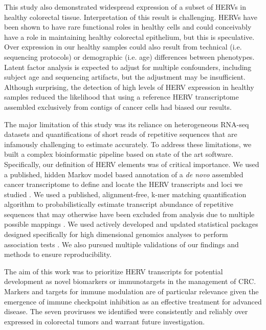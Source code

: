 This study also demonstrated widespread expression of a subset of HERVs in healthy colorectal tissue.
Interpretation of this result is challenging.
HERVs have been shown to have rare functional roles in healthy cells \citep{Rote2004} and could conceivably have a role in maintaining healthy colorectal epithelium, but this is speculative.
Over expression in our healthy samples could also result from technical (i.e. sequencing protocols) or demographic (i.e. age) differences between phenotypes.
Latent factor analysis is expected to adjust for multiple confounders, including subject age and sequencing artifacts, but the adjustment may be insufficient.
Although surprising, the detection of high levels of HERV expression in healthy samples reduced the likelihood that using a reference HERV transcriptome assembled exclusively from contigs of cancer cells had biased our results.

The major limitation of this study was its reliance on heterogeneous RNA-seq datasets and quantifications of short reads of repetitive sequences that are infamously challenging to estimate accurately.
To address these limitations, we built a complex bioinformatic pipeline based on state of the art software.
Specifically, our definition of HERV elements was of critical importance.
We used a published, hidden Markov model based annotation of a \emph{de novo} assembled cancer transcriptome to define and locate the HERV transcripts and loci we studied \citep{Attig2019}.
We used a published, alignment-free, k-mer matching quantification algorithm to probabilistically estimate transcript abundance of repetitive sequences that may otherwise have been excluded from analysis due to multiple possible mappings \citep{Patro2017}.
We used actively developed and updated statistical packages designed specifically for high dimensional genomics analyses to perform association tests \citep{Love2014, sva}.
We also pursued multiple validations of our findings and methods to ensure reproducibility.

The aim of this work was to prioritize HERV transcripts for potential development as novel biomarkers or immunotargets in the management of CRC.
Markers and targets for immune modulation are of particular relevance given the emergence of immune checkpoint inhibition as an effective treatment for advanced disease.
The seven proviruses we identified were consistently and reliably over expressed in colorectal tumors and warrant future investigation.
